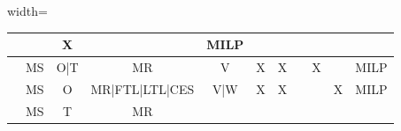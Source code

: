 \begin{table}[!ht]
\begin{adjustbox}{width=\textwidth}
\begin{tabular}{|c|c|c|c|c|c|c|l|c|c|c|}
                                                                                         &                & X
                                                                                         &
                                                                                         & MILP
      \\ \hline
      \autocite{Chitsaz2019ARouting}                                                     &
      MS                                                                                 &
      O|T                                                                                &
      MR                                                                                 &
      V                                                                                  &
      X                                                                                  &
      X                                                                                  &                &
      X                                                                                  &
                                                                                         &
      MILP                                                                                                                                              \\ \hline
      \autocite{Baller2022OptimizingApproach}                                            & MS
                                                                                         & O
                                                                                         & MR|FTL|LTL|CES
                                                                                         & V|W
                                                                                         & X
                                                                                         & X
                                                                                         &                &
                                                                                         & X
                                                                                         & MILP
      \\ \hline
      \autocite{Hashemi-Amiri2023IntegratedApproach}                                     &
      MS                                                                                 &
      T                                                                                  &
      MR                                                                                 &

\end{tabular}
\end{adjustbox}
\end{table}
